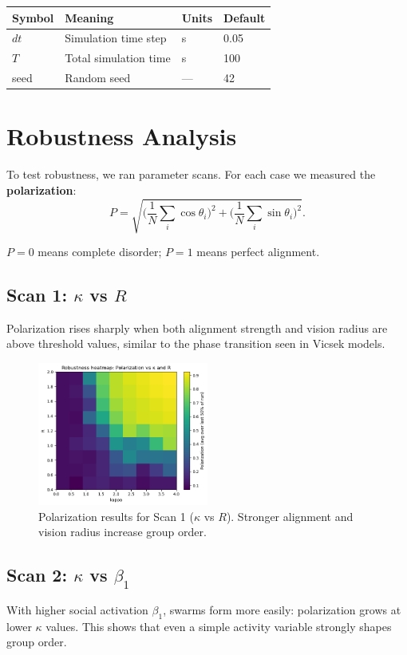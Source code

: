 \documentclass[11pt,a4paper]{article}
\begin{document}
\begin{tabular}{@{}llll@{}}
\toprule
Symbol & Meaning & Units & Default \\
\midrule
$dt$ & Simulation time step & s & 0.05 \\
$T$ & Total simulation time & s & 100 \\
seed & Random seed & --- & 42 \\
\bottomrule
\end{tabular}

\section{Robustness Analysis}

To test robustness, we ran parameter scans. For each case we measured the \textbf{polarization}:
\[
P = \sqrt{\Big(\frac{1}{N}\sum_i \cos \theta_i\Big)^2 + \Big(\frac{1}{N}\sum_i \sin \theta_i\Big)^2}.
\]

$P=0$ means complete disorder; $P=1$ means perfect alignment.

\subsection{Scan 1: $\kappa$ vs $R$}
Polarization rises sharply when both alignment strength and vision radius are above threshold values, similar to the phase transition seen in Vicsek models.

\begin{figure}[H]
    \centering
    \includegraphics[width=0.5\textwidth]{k_vs_r.png}
    \caption{Polarization results for Scan 1 ($\kappa$ vs $R$). Stronger alignment and vision radius increase group order.}
    \label{fig:scan1}
\end{figure}

\subsection{Scan 2: $\kappa$ vs $\beta_1$}
With higher social activation $\beta_1$, swarms form more easily: polarization grows at lower $\kappa$ values. This shows that even a simple activity variable strongly shapes group order.
\end{document}
